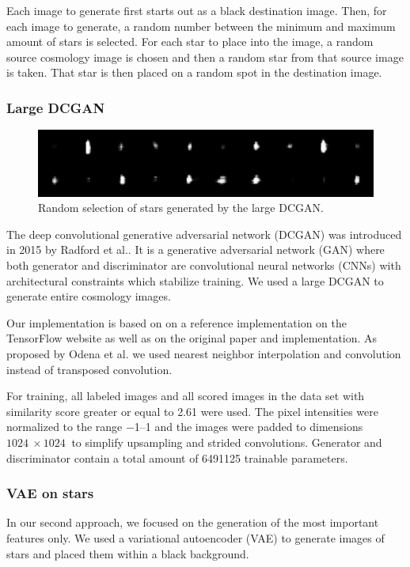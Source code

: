 \documentclass[10pt,conference,compsocconf]{IEEEtran}
\begin{document}
Each image to generate first starts out as a black destination image. Then, for each image to generate, a random number between the minimum and maximum amount of stars is selected. For each star to place into the image, a random source cosmology image is chosen and then a random star from that source image is taken. That star is then placed on a random spot in the destination image.

\subsubsection{Large DCGAN}

\begin{figure}%
    \centering
    \includegraphics[width=\columnwidth]{assets/star_ensemble_large_resized.png}
    \caption{Random selection of stars generated by the large DCGAN.}
    \label{fig:dcgan_stars}
\end{figure}

The deep convolutional generative adversarial network (DCGAN) was introduced in 2015 by Radford et al.\@ \cite{Radford}. It is a generative adversarial network (GAN) where both generator and discriminator are convolutional neural networks (CNNs) with architectural constraints which stabilize training. We used a large DCGAN to generate entire cosmology images. 

Our implementation is based on on a reference implementation on the TensorFlow website \cite{dcgantf} as well as on the original paper and implementation. As proposed by Odena et al.\@ \cite{Odena} we used nearest neighbor interpolation and convolution instead of transposed convolution.

For training, all labeled images and all scored images in the data set with similarity score greater or equal to \SI{2.61}{} were used. The pixel intensities were normalized to the range \SIrange{-1}{1}{} and the images were padded to dimensions $\SI{1024}{}\times\SI{1024}{}$ to simplify upsampling and strided convolutions. Generator and discriminator contain a total amount of \SI{6491125}{} trainable parameters.

\subsubsection{VAE on stars} %
In our second approach, we focused on the generation of the most important features only. We used a variational autoencoder (VAE) to generate images of stars and placed them within a black background. 
\end{document}
